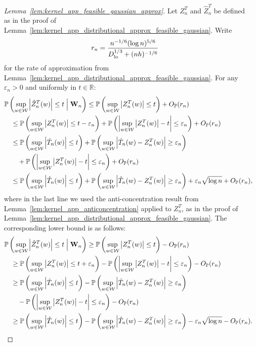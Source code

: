 \documentclass[11pt,lof]{puthesis}
\renewcommand{\P}{\ensuremath{\mathbb{P}}}
\newcommand{\R}{\ensuremath{\mathbb{R}}}
\newcommand{\bW}{\ensuremath{\mathbf{W}}}
\newcommand{\cW}{\ensuremath{\mathcal{W}}}
\newcommand{\Dl}{\ensuremath{D_{\textup{lo}}}}
\theoremstyle{break}
\theoremstyle{proof}
\newtheorem{proof}{Proof}
\begin{document}
\begin{proof}[Lemma~\ref{lem:kernel_app_feasible_gaussian_approx}]
Let $Z_n^T$ and $\hat Z_n^T$ be defined
as in the proof of
Lemma~\ref{lem:kernel_app_distributional_approx_feasible_gaussian}.
Write
%
\begin{align*}
r_n
&=
\frac{n^{-1/6}(\log n)^{5/6}}
{\Dl^{1/3} + (n h)^{-1/6}}
\end{align*}
%
for the rate of approximation from
Lemma~\ref{lem:kernel_app_distributional_approx_feasible_gaussian}.
For any $\varepsilon_n > 0$ and uniformly in $t \in \R$:
%
\begin{align*}
&\P\left(
\sup_{w \in \cW}
\left|
\hat Z_n^T(w)
\right|
\leq t
\Bigm\vert \bW_n
\right)
\leq
\P\left(
\sup_{w \in \cW}
\left|
Z_n^T(w)
\right|
\leq t
\right)
+
O_\P(r_n) \\
&\quad\leq
\P\left(
\sup_{w \in \cW}
\left|
Z_n^T(w)
\right|
\leq t - \varepsilon_n
\right)
+
\P\left(
\left|
\sup_{w \in \cW}
\big|
Z_n^T(w)
\big|
-t
\right|
\leq \varepsilon_n
\right)
+
O_\P(r_n) \\
&\quad\leq
\P\left(
\sup_{w \in \cW}
\left| \hat T_n(w) \right|
\leq t
\right)
+
\P\left(
\sup_{w \in \cW}
\left| \hat T_n(w) - Z_n^T(w) \right|
\geq \varepsilon_n
\right) \\
&\qquad+
\P\left(
\left|
\sup_{w \in \cW}
\big|
Z_n^T(w)
\big|
-t
\right|
\leq \varepsilon_n
\right)
+
O_\P(r_n) \\
&\quad\leq
\P\left(
\sup_{w \in \cW}
\left| \hat T_n(w) \right|
\leq t
\right)
+
\P\left(
\sup_{w \in \cW}
\left| \hat T_n(w) - Z_n^T(w) \right|
\geq \varepsilon_n
\right)
+ \varepsilon_n \sqrt{\log n}
+ O_\P(r_n),
\end{align*}
%
where in the last line we used the anti-concentration result
from Lemma~\ref{lem:kernel_app_anticoncentration}
applied to $Z_n^T$,
as in the proof of
Lemma~\ref{lem:kernel_app_distributional_approx_feasible_gaussian}.
The corresponding lower bound is as follows:
%
\begin{align*}
&\P\left(
\sup_{w \in \cW}
\left|
\hat Z_n^T(w)
\right|
\leq t
\Bigm\vert \bW_n
\right)
\geq
\P\left(
\sup_{w \in \cW}
\left|
Z_n^T(w)
\right|
\leq t
\right)
-
O_\P(r_n) \\
&\quad\geq
\P\left(
\sup_{w \in \cW}
\left|
Z_n^T(w)
\right|
\leq t + \varepsilon_n
\right)
-
\P\left(
\left|
\sup_{w \in \cW}
\big|
Z_n^T(w)
\big|
-t
\right|
\leq \varepsilon_n
\right)
-
O_\P(r_n) \\
&\quad\geq
\P\left(
\sup_{w \in \cW}
\left| \hat T_n(w) \right|
\leq t
\right)
-
\P\left(
\sup_{w \in \cW}
\left| \hat T_n(w) - Z_n^T(w) \right|
\geq \varepsilon_n
\right) \\
&\qquad-
\P\left(
\left|
\sup_{w \in \cW}
\big|
Z_n^T(w)
\big|
-t
\right|
\leq \varepsilon_n
\right)
-
O_\P(r_n) \\
&\quad\geq
\P\left(
\sup_{w \in \cW}
\left| \hat T_n(w) \right|
\leq t
\right)
-
\P\left(
\sup_{w \in \cW}
\left| \hat T_n(w) - Z_n^T(w) \right|
\geq \varepsilon_n
\right)
- \varepsilon_n \sqrt{\log n}
- O_\P(r_n).
\end{align*}


\end{proof}
\end{document}
